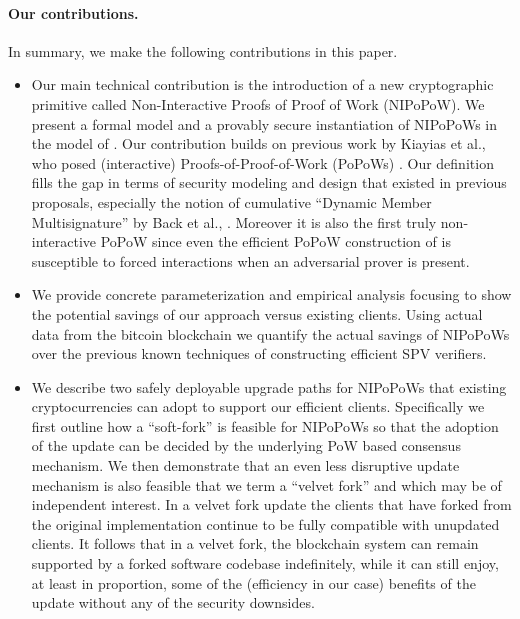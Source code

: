 \paragraph{Our contributions.}
In summary,  we make the following contributions in this paper.
  \begin{itemize}
    \item Our main technical contribution is the introduction of
    a new cryptographic
     primitive called Non-Interactive Proofs of Proof of Work (NIPoPoW). We present a formal model and a provably secure
     instantiation of NIPoPoWs in the model of \cite{backbone}.
     Our contribution builds on previous work by  Kiayias et al., who posed
     (interactive) Proofs-of-Proof-of-Work (PoPoWs) \cite{KLS}.
     Our definition fills the gap in terms of security modeling and design that
      existed in previous proposals, especially the notion of cumulative
      ``Dynamic Member Multisignature'' by Back et al., \cite{}. Moreover
      it is also the first truly non-interactive PoPoW since even the
      efficient PoPoW construction of \cite{KLS} is susceptible to forced
      interactions when an adversarial prover is present.

  \item We provide concrete parameterization and empirical analysis focusing to show the potential savings of our approach versus existing clients.
Using actual data from the bitcoin blockchain we quantify the actual savings of NIPoPoWs over
the previous known techniques of constructing efficient SPV verifiers.
   \item We describe two safely deployable upgrade paths for NIPoPoWs that existing cryptocurrencies can  adopt to support our efficient clients. Specifically
   we first outline how a ``soft-fork''  is feasible for NIPoPoWs so that the
   adoption of the update can be decided by the underlying PoW based consensus mechanism. We then demonstrate that an even less disruptive update mechanism is also feasible that we term a ``velvet fork'' and which may be of independent interest. In a velvet fork update the clients that have forked from the original implementation continue to be fully compatible with unupdated clients. It follows that in a velvet fork, the blockchain system can remain supported by a forked software codebase indefinitely, while it can still enjoy, at least in proportion, some of the (efficiency in our case) benefits of the update without any of the  security downsides.
  \end{itemize}

